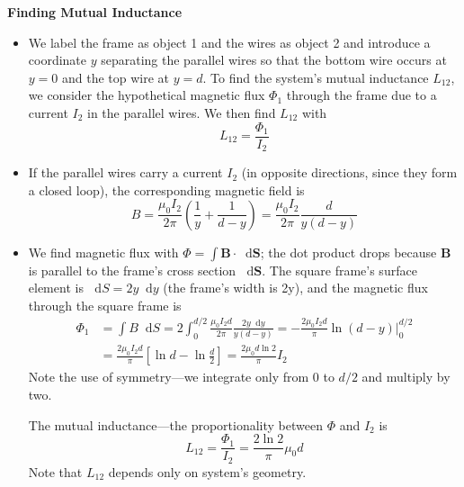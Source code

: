 \documentclass[11pt, a4paper]{article}
\newcommand{\diff}{\mathop{}\!\mathrm{d}} %
\renewcommand{\vec}[1]{\bm{#1}} %
\newcommand{\B}{\vec{B}}  %
\newcommand{\mm}{\mu_{0}}  %
\newcommand{\m}{\vec{m}}  %
\begin{document}
\vspace{2mm}
\textbf{Finding Mutual Inductance}
\begin{itemize}
	\item We label the frame as object 1 and the wires as object 2 and introduce a coordinate $ y $ separating the parallel wires so that the bottom wire occurs at $ y = 0 $ and the top wire at $ y = d $. To find the system's mutual inductance $ L_{12} $, we consider the hypothetical magnetic flux $ \Phi_{1} $ through the frame due to a current $ I_{2} $ in the parallel wires. We then find $ L_{12} $ with
	\begin{equation*}
		L_{12} = \frac{\Phi_{1}}{I_{2}}
	\end{equation*}
	
	\item If the parallel wires carry a current $ I_{2} $ (in opposite directions, since they form a closed loop), the corresponding magnetic field is
	\begin{equation*}
		B = \frac{\mm I_{2}}{2\pi} \left(\frac{1}{y} + \frac{1}{d-y}\right) =  \frac{\mm I_{2}}{2\pi}  \frac{d}{y(d-y)}
	\end{equation*}

	
	\item We find magnetic flux with $ \Phi = \int \B \cdot \diff \vec{S} $; the dot product drops because $ \B $ is parallel to the frame's cross section $ \diff \vec{S} $. The square frame's surface element is $ \diff S = 2y\diff y $ (the frame's width is 2y), and the magnetic flux through the square frame is
	\begin{align*}
		\Phi_{1} &= \int B \diff S = 2\int_{0}^{d/2} \frac{\mm I_{2}d}{2\pi}  \frac{2y\diff y}{y(d-y)} = -\frac{2\mm I_{2}d}{\pi} \ln(d-y)\big |_{0}^{d/2}\\
		& =  \frac{2\mm I_{2}d}{\pi} \left[\ln d - \ln\frac{d}{2}\right] =  \frac{2\mm d \ln 2}{\pi}  I_{2}
	\end{align*}
	Note the use of symmetry---we integrate only from $ 0 $ to $ d/2 $ and multiply by two.
	
	The mutual inductance---the proportionality between $ \Phi $ and $ I_{2} $ is 
	\begin{equation*}
		L_{12} = \frac{\Phi_{1}}{I_{2}} = \frac{2\ln 2}{\pi} \mm d
	\end{equation*}
	Note that $ L_{12} $ depends only on system's geometry. 
\end{itemize}
\end{document}
